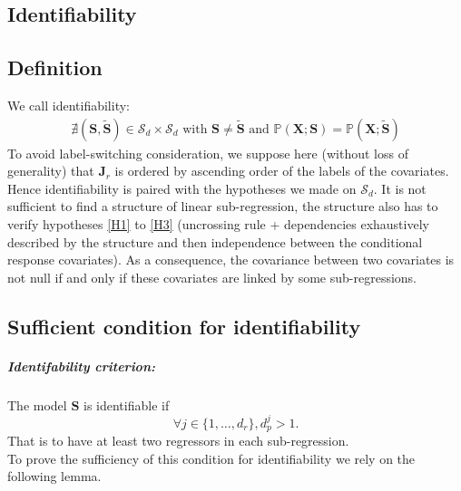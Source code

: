 \documentclass[12pt,a4paper]{report}
\begin{document}
\begin{appendices}
	\chapter{Identifiability}\label{sectionident}
		\section{Definition}
		We call identifiability:
\begin{eqnarray}
	\nexists (\boldsymbol{S},\tilde{\boldsymbol{S}}) \in \mathcal{S}_d\times \mathcal{S}_d \textrm{ with } \boldsymbol{S} \neq \tilde{\boldsymbol{S}} \textrm{ and }
	\mathbb{P}(\boldsymbol{X};\boldsymbol{S})=\mathbb{P}(\boldsymbol{X};\tilde{\boldsymbol{S}})
 \end{eqnarray}
 To avoid label-switching consideration, we suppose here (without loss of generality) that $\boldsymbol{J}_r$ is ordered by ascending order of the labels of the covariates.
	Hence identifiability is paired with the hypotheses we made on $ \mathcal{S}_d$. It is not sufficient to find a structure of linear sub-regression, the structure also has to verify hypotheses \ref{H1} to \ref{H3} (uncrossing rule + dependencies exhaustively described by the structure and then independence between the conditional response covariates). As a consequence, the covariance between two covariates is not null if and only if these covariates are linked by some sub-regressions.
 
		\section{Sufficient condition for identifiability}\label{suffcondident}

\paragraph{Identifability criterion:} The model $\boldsymbol{S}$ is identifiable if
			\begin{equation}
				\forall j \in \{1,\dots,d_r\},  d_p^j>1\label{identcondition}.
			\end{equation}
That is to have at least two regressors in each sub-regression.\\

To prove the sufficiency of this condition for identifiability we rely on the following lemma.


\end{appendices}
\end{document}
